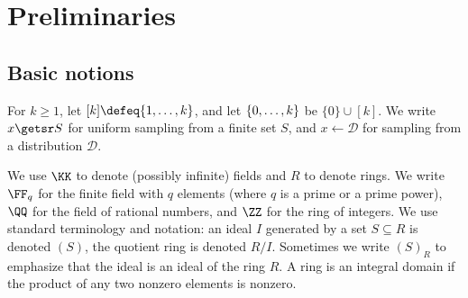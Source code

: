 




\section{Preliminaries}\label{sec:zinc-preliminaries}
\label{s:extended_preliminaries}



\subsection{Basic notions}\label{s:basic_notions}




For $k\geq 1$, let $[k]\defeq \{1,\ldots, k\}$, and let $\range{0}{k}$ be $\{0\}\cup[k]$. We write $x\getsr S$ for uniform sampling from a finite set $S$, and $x\gets\mathcal{D}$ for sampling from a distribution $\mathcal{D}$.






We use $\KK$ to denote (possibly infinite) fields and $R$ to denote rings. We write $\FF_q$ for the finite field with $q$ elements (where $q$ is a prime or a prime power), $\QQ$ for the field of rational numbers, and $\ZZ$ for the ring of integers. We use standard terminology and notation: an ideal $I$ generated by a set $S\subseteq R$ is denoted $(S)$, the quotient ring is denoted $R/I$.   Sometimes we write $(S)_R$ to emphasize that the ideal is an ideal of the ring $R$. A ring is an integral domain if the product of any two nonzero elements is nonzero.



